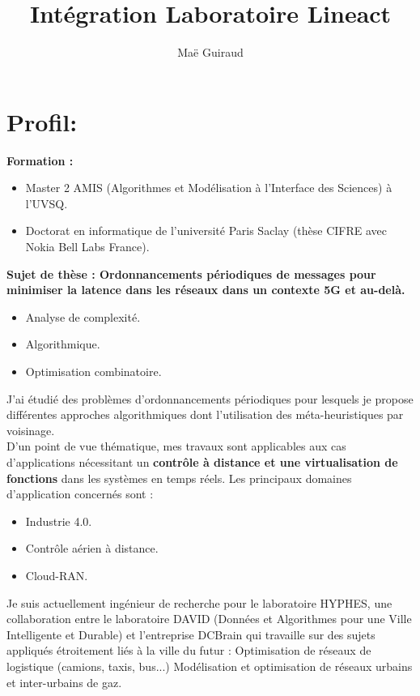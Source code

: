 \documentclass[a4paper,10pt]{article}
\title{Intégration Laboratoire Lineact}
\author{Maë Guiraud}
\begin{document}
\maketitle

\section{Profil:}

\textbf{Formation :}
\begin{itemize}
\item Master 2 AMIS (Algorithmes et Modélisation à l’Interface des Sciences) à l’UVSQ. 
\item Doctorat en informatique de l’université Paris Saclay (thèse CIFRE avec Nokia Bell Labs France).
\end{itemize}

\textbf{Sujet de thèse : Ordonnancements périodiques de messages pour minimiser la latence dans les réseaux dans un contexte 5G et au-delà.}
\begin{itemize}
\item Analyse de complexité.
\item Algorithmique.
\item Optimisation combinatoire.
\end{itemize}
J'ai étudié des problèmes d'ordonnancements périodiques pour lesquels je propose différentes approches algorithmiques dont l'utilisation des méta-heuristiques par voisinage.
\\

D'un point de vue thématique, mes travaux sont applicables aux cas d'applications nécessitant un \textbf{contrôle à distance et une virtualisation de fonctions} dans les systèmes en temps réels. Les principaux domaines d'application concernés sont :
\begin{itemize}
\item Industrie 4.0.
\item Contrôle aérien à distance.
\item Cloud-RAN.

\end{itemize}

Je suis actuellement ingénieur de recherche pour le laboratoire HYPHES, une collaboration entre le laboratoire DAVID (Données et Algorithmes pour une Ville Intelligente et Durable) et l’entreprise DCBrain qui travaille sur des sujets appliqués étroitement liés à la ville du futur :
Optimisation de réseaux de logistique (camions, taxis, bus...) Modélisation et optimisation de réseaux urbains et inter-urbains de gaz.
\end{document}
